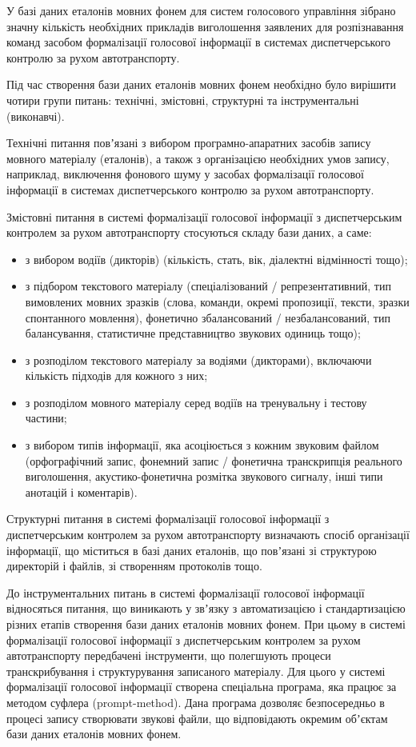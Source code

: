 У базі даних еталонів мовних фонем для систем голосового управління зібрано значну кількість необхідних прикладів виголошення заявлених для розпізнавання команд засобом формалізації голосової інформації в системах диспетчерського контролю за рухом автотранспорту.

Під час створення бази даних еталонів мовних фонем необхідно було вирішити чотири групи питань: технічні, змістовні, структурні та інструментальні (виконавчі).

Технічні питання повʼязані з вибором програмно-апаратних засобів запису мовного матеріалу (еталонів), а також з організацією необхідних умов запису, наприклад, виключення фонового шуму у засобах формалізації голосової інформації в системах диспетчерського контролю за рухом автотранспорту.

Змістовні питання в системі формалізації голосової інформації з диспетчерським контролем за рухом автотранспорту стосуються складу бази даних, а саме:

\begin{itemize}
	\item з вибором водіїв (дикторів) (кількість, стать, вік, діалектні відмінності тощо);
	\item з підбором текстового матеріалу (спеціалізований / репрезентативний, тип вимовлених мовних зразків (слова, команди, окремі пропозиції, тексти, зразки спонтанного мовлення), фонетично збалансований / незбалансований, тип балансування, статистичне представництво звукових одиниць тощо);
	\item з розподілом текстового матеріалу за водіями (дикторами), включаючи кількість підходів для кожного з них;
	\item з розподілом мовного матеріалу серед водіїв на тренувальну і тестову частини;
	\item з вибором типів інформації, яка асоціюється з кожним звуковим файлом (орфографічний запис, фонемний запис / фонетична транскрипція реального виголошення, акустико-фонетична розмітка звукового сигналу, інші типи анотацій і коментарів).
\end{itemize}

Структурні питання в системі формалізації голосової інформації з диспетчерським контролем за рухом автотранспорту визначають спосіб організації інформації, що міститься в базі даних еталонів, що повʼязані зі структурою директорій і файлів, зі створенням протоколів тощо.

До інструментальних питань в системі формалізації голосової інформації відносяться питання, що виникають у звʼязку з автоматизацією і стандартизацією різних етапів створення бази даних еталонів мовних фонем. При цьому в системі формалізації голосової інформації з диспетчерським контролем за рухом автотранспорту передбачені інструменти, що полегшують процеси транскрибування і структурування записаного матеріалу. Для цього у системі формалізації голосової інформації створена спеціальна програма, яка працює за методом суфлера (prompt-method). Дана програма дозволяє безпосередньо в процесі запису створювати звукові файли, що відповідають окремим обʼєктам бази даних еталонів мовних фонем.

